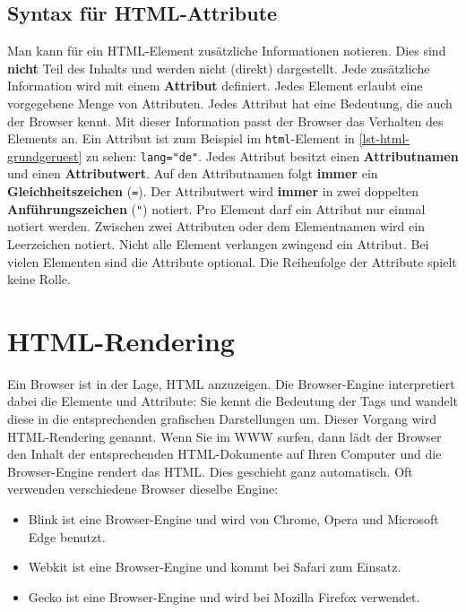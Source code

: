 \subsection{Syntax für \ac{HTML}-Attribute}

Man kann für ein \ac{HTML}-Element zusätzliche Informationen notieren. Dies sind \textbf{nicht} Teil des Inhalts und werden nicht (direkt) dargestellt. Jede zusätzliche Information wird mit einem \textbf{Attribut} definiert. Jedes Element erlaubt eine vorgegebene Menge von Attributen. Jedes Attribut hat eine Bedeutung, die auch der Browser kennt. Mit dieser Information passt der Browser das Verhalten des Elements an.  Ein Attribut ist zum Beispiel im \lstinline[language=html]{html}-Element in \autoref{lst-html-grundgeruest} zu sehen: \lstinline[language=html]{lang="de"}. Jedes Attribut besitzt einen \textbf{Attributnamen} und einen \textbf{Attributwert}. Auf den Attributnamen folgt \textbf{immer} ein \textbf{Gleichheitszeichen} (\texttt{=}). Der Attributwert wird \textbf{immer} in zwei doppelten \textbf{Anführungszeichen} (\texttt{"}) notiert. Pro Element darf ein Attribut nur einmal notiert werden. Zwischen zwei Attributen oder dem Elementnamen wird ein Leerzeichen notiert. Nicht alle Element verlangen zwingend ein Attribut. Bei vielen Elementen sind die Attribute optional. Die Reihenfolge der Attribute spielt keine Rolle.


\section{\ac{HTML}-Rendering}

Ein Browser ist in der Lage, HTML anzuzeigen. Die Browser-Engine interpretiert dabei die Elemente und Attribute: Sie kennt die Bedeutung der Tags und wandelt diese in die entsprechenden grafischen Darstellungen um. Dieser Vorgang wird HTML-Rendering genannt. Wenn Sie im \ac{WWW} surfen, dann lädt der Browser den Inhalt der entsprechenden HTML-Dokumente auf Ihren Computer und die Browser-Engine rendert das HTML. Dies geschieht ganz automatisch. Oft verwenden verschiedene Browser dieselbe Engine:

\begin{itemize}
	\item Blink ist eine Browser-Engine und wird von Chrome, Opera und Microsoft Edge benutzt.
	\item Webkit ist eine Browser-Engine und kommt bei Safari zum Einsatz.
	\item Gecko ist eine Browser-Engine und wird bei Mozilla Firefox verwendet.
\end{itemize}

